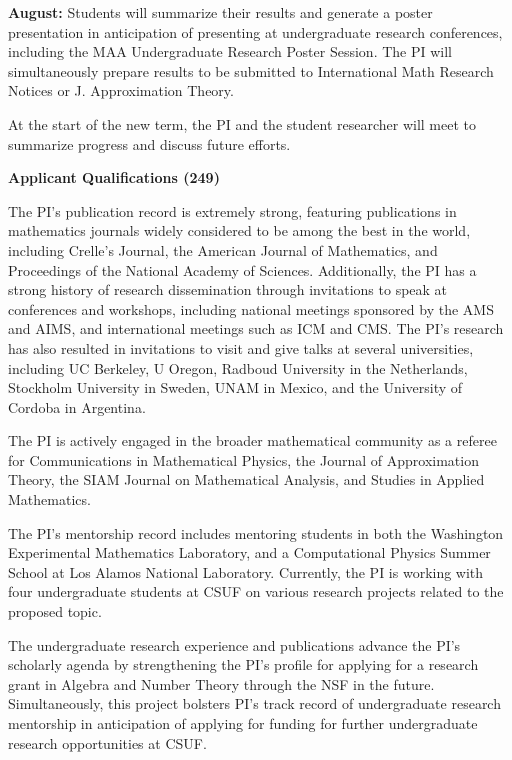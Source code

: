 \documentclass[12pt,letterpaper]{article}
\theoremstyle{definition}
\begin{document}
\textbf{August:} Students will summarize their results and generate a poster
presentation in anticipation of presenting at undergraduate research
conferences, including the MAA Undergraduate Research Poster Session.  The PI
will simultaneously prepare results to be submitted to International Math
Research Notices or J. Approximation Theory.

At the start of the new term, the PI and the student researcher will meet to
summarize progress and discuss future efforts.

\newpage
\noindent\textbf{Applicant Qualifications (249)}

The PI's publication record is extremely strong, featuring publications in mathematics journals widely considered to be among the best in the world, including Crelle's Journal, the American Journal of Mathematics, and Proceedings of the National Academy of Sciences.  Additionally, the PI has a strong history of research dissemination through invitations to speak at conferences and workshops, including national meetings sponsored by the AMS and AIMS, and international meetings such as ICM and CMS.  The PI's research has also resulted in invitations to visit and give talks at several universities, including UC Berkeley, U Oregon, Radboud University in the Netherlands, Stockholm University in Sweden, UNAM in Mexico, and the University of Cordoba in Argentina.

The PI is actively engaged in the broader mathematical community as a referee for Communications in Mathematical Physics, the Journal of Approximation Theory, the SIAM Journal on Mathematical Analysis, and Studies in Applied Mathematics.

The PI's mentorship record includes mentoring students in both the Washington Experimental Mathematics Laboratory, and a Computational Physics Summer School at Los Alamos National Laboratory.  Currently, the PI is working with four undergraduate students at CSUF on various research projects related to the proposed topic.  

The undergraduate research experience and publications advance the PI's scholarly agenda by strengthening the PI's profile for applying for a research grant in Algebra and Number Theory through the NSF in the future.  Simultaneously, this project bolsters PI's track record of undergraduate research mentorship in anticipation of applying for funding for further undergraduate research opportunities at CSUF.

\newpage

\end{document}
